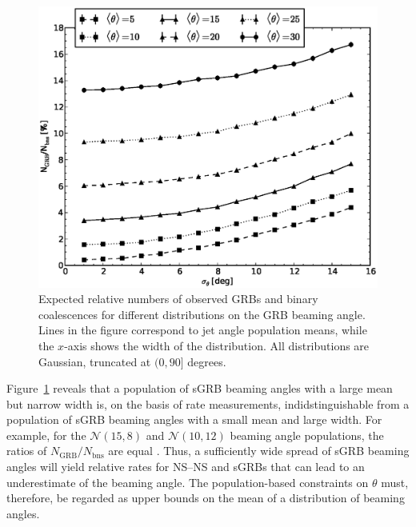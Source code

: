 \documentclass[twocolumn,nofootinbib]{revtex4-1}
\newcommand{\BNS}{\ac{NS}--\ac{NS}\xspace}
\newcommand{\red}[1]{{\color{red}{#1}}}
\begin{document}
\begin{figure}
\centering
\includegraphics[width=\linewidth]{theta_dist_grbfrac.eps}
\caption{\label{fig:thetapopulation} Expected relative
numbers of observed GRBs and binary coalescences for different distributions
on the GRB beaming angle.  Lines in the figure correspond to jet angle
population means, while the $x$-axis shows the width of the distribution.  All 
distributions are Gaussian, truncated at $(0, 90]$ degrees.\label{fig:thetapop}}
\end{figure}

Figure~\ref{fig:thetapop} reveals that a population of \ac{sGRB} beaming angles with a large mean but narrow width is, on the basis of rate measurements, indidstinguishable from a population of \ac{sGRB} beaming angles with a small mean and large width.
For example, for the ${\mathcal N}(15,8)$ and ${\mathcal N}(10,12)$ beaming angle populations, the ratios of $N_{\mathrm{GRB}}/N_{\mathrm{bns}}$ are equal \red{add a line to the figure}.
Thus, a sufficiently wide spread of \ac{sGRB} beaming angles will yield relative rates for \BNS and \acp{sGRB} that can lead to an underestimate of the beaming angle.
The population-based constraints on $\theta$ must, therefore, be regarded as upper bounds on the mean of a distribution of beaming angles.
\red{not sure if i've got this the right way round}

\red{Also need to mention that the variation in the ratio with distribution width is quite small; for a given mean value $\langle \theta \rangle$, the ratio is rather insensitive to the width}
\end{document}
